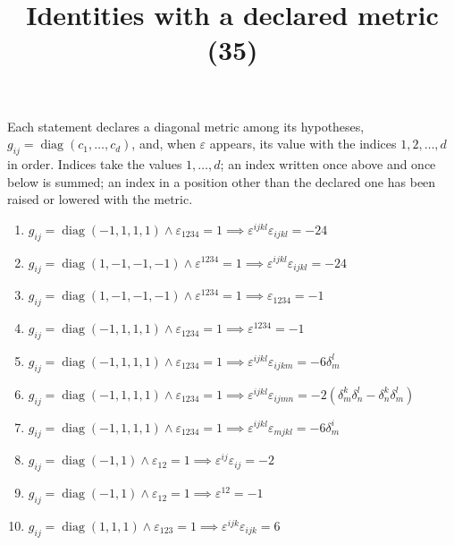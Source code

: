 \documentclass[11pt,a4paper]{article}
\title{Identities with a declared metric (35)}
\author{}
\date{}
\begin{document}
\maketitle
Each statement declares a diagonal metric among its hypotheses, $g_{ij} = \operatorname{diag}(c_1, \dots, c_d)$, and, when $\varepsilon$ appears, its value with the indices $1, 2, \dots, d$ in order. Indices take the values $1, \dots, d$; an index written once above and once below is summed; an index in a position other than the declared one has been raised or lowered with the metric.

\begin{enumerate}
\item $\displaystyle g_{ij} = \operatorname{diag}(-1, 1, 1, 1) \land \varepsilon_{1234} = 1 \implies \varepsilon^{ijkl}\varepsilon_{ijkl} = -24$
\item $\displaystyle g_{ij} = \operatorname{diag}(1, -1, -1, -1) \land \varepsilon^{1234} = 1 \implies \varepsilon^{ijkl}\varepsilon_{ijkl} = -24$
\item $\displaystyle g_{ij} = \operatorname{diag}(1, -1, -1, -1) \land \varepsilon^{1234} = 1 \implies \varepsilon_{1234} = -1$
\item $\displaystyle g_{ij} = \operatorname{diag}(-1, 1, 1, 1) \land \varepsilon_{1234} = 1 \implies \varepsilon^{1234} = -1$
\item $\displaystyle g_{ij} = \operatorname{diag}(-1, 1, 1, 1) \land \varepsilon_{1234} = 1 \implies \varepsilon^{ijkl}\varepsilon_{ijkm} = -6\delta^{l}_{m}$
\item $\displaystyle g_{ij} = \operatorname{diag}(-1, 1, 1, 1) \land \varepsilon_{1234} = 1 \implies \varepsilon^{ijkl}\varepsilon_{ijmn} = -2\left( \delta^{k}_{m}\delta^{l}_{n} - \delta^{k}_{n}\delta^{l}_{m} \right)$
\item $\displaystyle g_{ij} = \operatorname{diag}(-1, 1, 1, 1) \land \varepsilon_{1234} = 1 \implies \varepsilon^{ijkl}\varepsilon_{mjkl} = -6\delta^{i}_{m}$
\item $\displaystyle g_{ij} = \operatorname{diag}(-1, 1) \land \varepsilon_{12} = 1 \implies \varepsilon^{ij}\varepsilon_{ij} = -2$
\item $\displaystyle g_{ij} = \operatorname{diag}(-1, 1) \land \varepsilon_{12} = 1 \implies \varepsilon^{12} = -1$
\item $\displaystyle g_{ij} = \operatorname{diag}(1, 1, 1) \land \varepsilon_{123} = 1 \implies \varepsilon^{ijk}\varepsilon_{ijk} = 6$

\end{enumerate}
\end{document}
